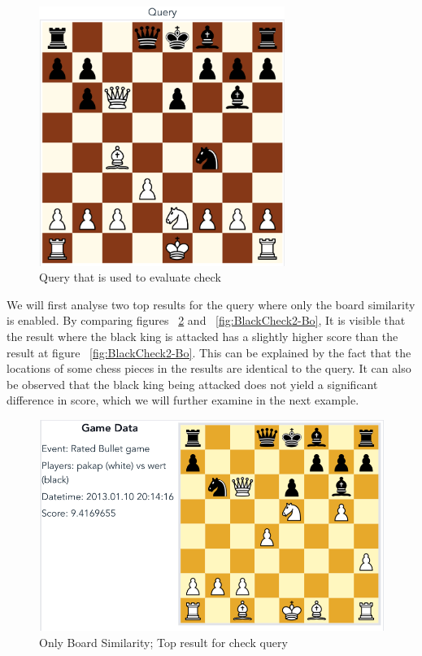 \documentclass[11pt]{article}
\begin{document}
    \begin{figure}[H]
        \centering
        \includegraphics[width=8cm]{images/QueryBlackCheck}
        \caption{Query that is used to evaluate check}
        \label{fig:BlackCheckQuery}
    \end{figure}

    We will first analyse two top results for the query where only the board similarity is enabled. By comparing figures ~\ref{fig:BlackCheck1-Bo} and ~\ref{fig:BlackCheck2-Bo}, It is visible that the result where the black king is attacked has a slightly higher score than the result at figure ~\ref{fig:BlackCheck2-Bo}. This can be explained by the fact that the locations of some chess pieces in the results are identical to the query. It can also be observed that the black king being attacked does not yield a significant difference in score, which we will further examine in the next example.

    \begin{figure}[H]
        \centering
        \includegraphics[width=12cm]{images/BlackCheck1-Bo}
        \caption{Only Board Similarity; Top result for check query}
        \label{fig:BlackCheck1-Bo}
    \end{figure}
\end{document}

